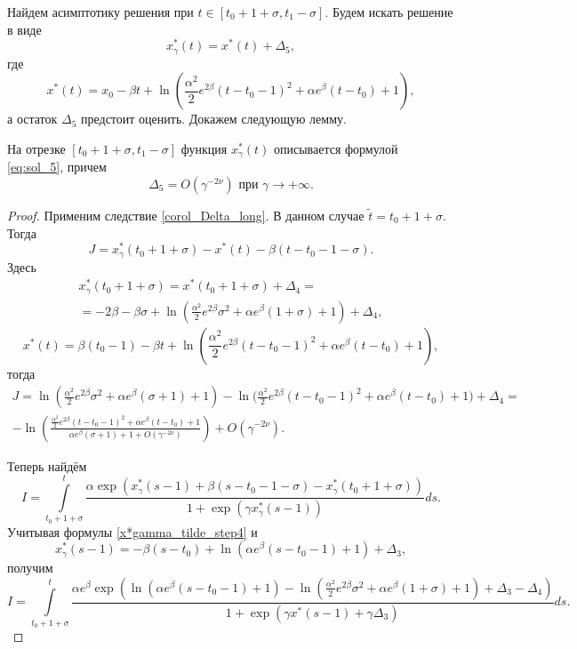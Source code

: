 Найдем асимптотику решения при $t \in [t_0 + 1 + \sigma, t_1 - \sigma]$. Будем искать решение в виде
\begin{equation}
	\label{eq:sol_5}
	x_\gamma^*(t) = x^*(t) + \Delta_5,
\end{equation}
%
где 
\[x^*(t) = x_0 - \beta t + \ln\left(\frac{\alpha^2}{2} e^{2\beta} (t - t_0 - 1)^2 + \alpha e^{\beta}(t - t_0) + 1 \right),\]
а остаток $\Delta_5$ предстоит оценить. Докажем следующую лемму.
%
\begin{lemma}
\label{lem_Delta5}
На отрезке $[t_0 + 1 + \sigma, t_1 - \sigma]$ функция $x_\gamma^*(t)$ описывается формулой \eqref{eq:sol_5}, причем
\[
\Delta_5 = O(\gamma^{-2\nu}) \text{ при } \gamma \to +\infty.
\]
\end{lemma}
\begin{proof}
%
Применим следствие \ref{corol_Delta_long}. В данном случае $\tilde{t} = t_0 + 1 + \sigma$.
Тогда
%
\[
J = x_\gamma^*(t_0+1+\sigma) - x^*(t) - \beta(t - t_0 - 1 - \sigma).
\]
%
Здесь
\begin{multline}
	\label{x*gamma_tilde_step4}
	x_\gamma^*(t_0 + 1 + \sigma) = x^*(t_0 + 1 + \sigma) + \Delta_4 = \\
	= -2 \beta - \beta \sigma + \ln\left(\frac{\alpha^2}{2} e^{2\beta} \sigma^2 + \alpha e^{\beta} (1 + \sigma) + 1 \right) + \Delta_4,
\end{multline}
%
\[
x^*(t) = \beta(t_0 - 1) - \beta t + \ln\left(\frac{\alpha^2}{2} e^{2\beta}(t - t_0 - 1)^2 + \alpha e^{\beta}(t - t_0) + 1\right),
\]
%
тогда
\begin{multline}
	\label{J_step5}
	J = \ln\left(\frac{\alpha^2}{2}e^{2\beta}\sigma^2 + \alpha e^{\beta}(\sigma + 1) + 1 \right) - \ln\Big(\frac{\alpha^2}{2}e^{2\beta}(t - t_0 - 1)^2+\alpha e^{\beta}(t - t_0) + 1 \Big) + \Delta_4=
	\\
	-\ln\left(\frac{\frac{\alpha^2}{2}e^{2\beta}(t - t_0 - 1)^2+\alpha e^{\beta}(t - t_0) + 1}{\alpha e^{\beta}(\sigma + 1) + 1 + O(\gamma^{-2\nu})}\right) + O(\gamma^{-2\nu}).
\end{multline}

Теперь найдём
\begin{equation*}
	I = \int\limits_{t_0 + 1 + \sigma}^{t} \frac{\alpha \exp(x_\gamma^*(s - 1) + \beta(s - t_0 - 1 - \sigma) - x_\gamma^*(t_0 + 1 + \sigma))}{1 + \exp(\gamma x_\gamma^*(s - 1))}ds.
\end{equation*}
Учитывая формулы \eqref{x*gamma_tilde_step4} и
%
\[
x_\gamma^*(s-1) = -\beta (s - t_0) + \ln(\alpha e^{\beta}(s - t_0 - 1) + 1) + \Delta_3,
\]
%
получим
%
\small
\begin{equation*}
	I = \int\limits_{t_0 + 1 + \sigma}^{t}\frac{\alpha e^\beta \exp\left( \ln(\alpha e^{\beta}(s - t_0 - 1) + 1) - \ln(\frac{\alpha^2}{2} e^{2\beta} \sigma^2 + \alpha e^{\beta}(1 + \sigma) + 1) + \Delta_3 - \Delta_4 \right)}{1 + \exp\left(\gamma x^*(s-1)  +\gamma\Delta_3\right)} ds.
\end{equation*}
\normalsize


\end{proof}
